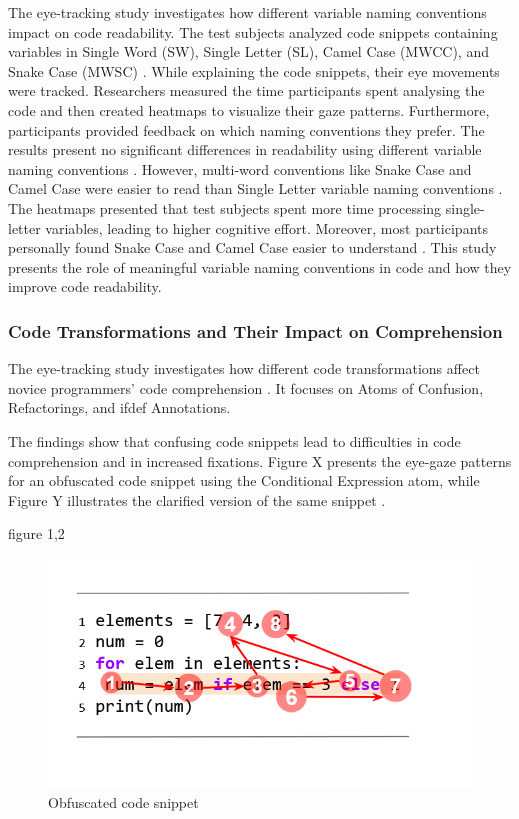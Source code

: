 The eye-tracking study \citet{broberg2019using}investigates how different variable naming conventions impact on code readability.  
The test subjects analyzed code snippets containing variables in Single Word (SW), Single Letter (SL), Camel Case (MWCC), and Snake Case (MWSC) \citet{broberg2019using}. While explaining the code snippets, their eye movements were tracked. Researchers measured the time participants spent analysing the code and then created heatmaps to visualize their gaze patterns. Furthermore, participants provided feedback on which naming conventions they prefer. The results present no significant differences in readability using different variable naming conventions \citet{broberg2019using}. However, multi-word conventions like Snake Case and Camel Case were easier to read than Single Letter variable naming conventions \citet{broberg2019using}. The heatmaps presented that test subjects spent more time processing single-letter variables, leading to higher cognitive effort. Moreover, most participants personally found Snake Case and Camel Case easier to understand \citet{broberg2019using}. 
This study presents the role of meaningful variable naming conventions in code and how they improve code readability.   

\subsubsection{Code Transformations and Their Impact on Comprehension}
The eye-tracking study \citet{silva2023evaluating} investigates how different code transformations affect novice programmers’ code comprehension \citet{silva2023evaluating}. It focuses on Atoms of Confusion, Refactorings, and ifdef Annotations.

The findings show that confusing code snippets lead to difficulties in code comprehension and in increased fixations. Figure X presents the eye-gaze patterns for an obfuscated code snippet using the Conditional Expression atom, while Figure Y illustrates the clarified version of the same snippet \citet{silva2023evaluating}.
 
figure 1,2
\begin{figure} [h!]
  \centering
  \includegraphics[scale=0.6]{figures/a.png}
  \caption{Obfuscated code snippet \citet{silva2023evaluating}}
  \label{fig:AnhangsChor}
\end{figure}


